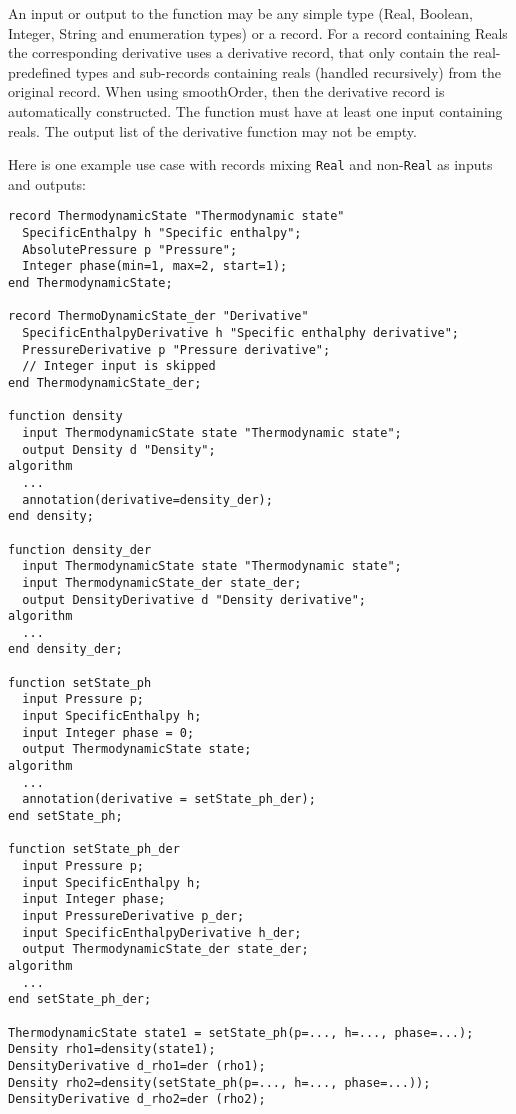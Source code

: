 An input or output to the function may be any simple type (Real,
Boolean, Integer, String and enumeration types) or a record. For a
record containing Reals the corresponding derivative uses a derivative
record, that only contain the real-predefined types and sub-records
containing reals (handled recursively) from the original record. When
using smoothOrder, then the derivative record is automatically
constructed. The function must have at least one input containing reals.
The output list of the derivative function may not be empty.

\begin{example}
Here is one example use case with records mixing \lstinline!Real! and
non-\lstinline!Real! as inputs and outputs:
\begin{lstlisting}[language=modelica]
record ThermodynamicState "Thermodynamic state"
  SpecificEnthalpy h "Specific enthalpy";
  AbsolutePressure p "Pressure";
  Integer phase(min=1, max=2, start=1);
end ThermodynamicState;

record ThermoDynamicState_der "Derivative"
  SpecificEnthalpyDerivative h "Specific enthalphy derivative";
  PressureDerivative p "Pressure derivative";
  // Integer input is skipped
end ThermodynamicState_der;

function density
  input ThermodynamicState state "Thermodynamic state";
  output Density d "Density";
algorithm
  ...
  annotation(derivative=density_der);
end density;

function density_der
  input ThermodynamicState state "Thermodynamic state";
  input ThermodynamicState_der state_der;
  output DensityDerivative d "Density derivative";
algorithm
  ...
end density_der;

function setState_ph
  input Pressure p;
  input SpecificEnthalpy h;
  input Integer phase = 0;
  output ThermodynamicState state;
algorithm
  ...
  annotation(derivative = setState_ph_der);
end setState_ph;

function setState_ph_der
  input Pressure p;
  input SpecificEnthalpy h;
  input Integer phase;
  input PressureDerivative p_der;
  input SpecificEnthalpyDerivative h_der;
  output ThermodynamicState_der state_der;
algorithm
  ...
end setState_ph_der;

ThermodynamicState state1 = setState_ph(p=..., h=..., phase=...);
Density rho1=density(state1);
DensityDerivative d_rho1=der (rho1);
Density rho2=density(setState_ph(p=..., h=..., phase=...));
DensityDerivative d_rho2=der (rho2);
\end{lstlisting}
\end{example}

